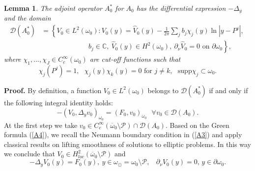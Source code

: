 \documentclass[11pt]{article}%
\newtheorem{lemma}[theorem]{Lemma}
\numberwithin{equation}{section}
\begin{document}
\begin{lemma}
\label{lem1A}The adjoint operator $A_{0}^{\ast}$ for $A_{0}$ has the
differential expression $-\Delta_{y}$ and the domain%
\begin{align}
\mathcal{D}(A_{0}^{\ast})  &  =\left\{  V_{0}\in L^{2}(\omega_{0}%
):V_{0}(y)=\widehat{V}_{0}(y)-\frac{1}{2\pi}%
{\textstyle\sum\nolimits_{j}}
b_{j}\chi_{j}(y)\ln|y-P^{j}|,\right.  \ \label{A5}\\
&  \ \ \ \ \ \ \ \ \ \ \ \ \ \ \ \ \ \ \ \ \ \ \ \ \ \ \ \ \ \ \ \left.
b_{j}\in\mathbb{C},\ \widehat{V}_{0}(y)\in H^{2}(\omega_{0}),\ \partial_{\nu
}\widehat{V}_{0}=0\text{ on }\partial\omega_{0}\right\}  ,\nonumber
\end{align}
where $\chi_{1},...,\chi_{J}\in C_{c}^{\infty}(\omega_{0})$ are cut-off
functions such that
\[
\chi_{j}(P^{j})=1,\ \ \ \chi_{j}(y)\chi_{k}(y)=0\text{ for }j\neq
k,\ \ \ \mathrm{supp}\chi_{j}\subset\omega_{0}.
\]

\end{lemma}

\textbf{Proof.} By definition, a function $V_{0}\in L^{2}(\omega_{0})$ belongs
to $\mathcal{D}(A_{0}^{\ast})$ if and only if the following integral identity
holds:%
\begin{equation}
-(V_{0},\Delta_{y}v_{0})_{\omega_{0}}=(F_{0},v_{0})_{\omega_{0}}\ \ \ \forall
v_{0}\in\mathcal{D}(A_{0}). \label{A6}%
\end{equation}
At the first step we take $v_{0}\in C_{c}^{\infty}(\overline{\omega}%
_{0}\setminus\mathcal{P})\cap\mathcal{D}(A_{0}).$ Based on the Green formula
(\ref{A4}), we recall the Neumann boundary condition in (\ref{A3}) and apply
classical results \cite[\S 3-6, Ch. 2]{LiMa} on lifting smoothness of
solutions to elliptic problems. In this way we conclude that $V_{0}\in
H_{loc}^{2}(\overline{\omega}_{0}\setminus\mathcal{P})$ and%
\begin{equation}
-\Delta_{y}V_{0}(y)=F_{0}(y),\ y\in\omega_{\odot}=\omega_{0}\setminus
\mathcal{P},\ \ \ \ \partial_{\nu}V_{0}(y)=0\text{, }y\in\partial\omega_{0}.
\label{A7}%
\end{equation}
\end{document}
